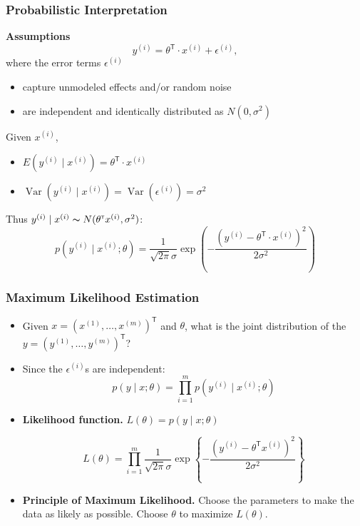 \documentclass[xcolor=table]{beamer}
\newcommand{\trans}[1]{\ensuremath{#1}^{\scriptscriptstyle{\textsf{T}}}}
\DeclareMathOperator{\Var}{Var}
\begin{document}
\begin{frame}[t]
\frametitle{Probabilistic Interpretation}
\textbf{Assumptions}
\[
    y^{(i)} = \trans{\theta} \cdot x^{(i)} + \epsilon^{(i)},  
\]
where the error terms $\epsilon^{(i)}$
\begin{itemize}
    \item capture unmodeled effects and/or random noise

    \item are independent and identically distributed as $N(0, \sigma^2)$ 
\end{itemize}

\pause

\medskip

Given $x^{(i)}$, 
\begin{itemize}
    \item $E(y^{(i)} \mid x^{(i)}) = \trans{\theta} \cdot x^{(i)}$
    
    \pause

    \item $\Var(y^{(i)} \mid x^{(i)}) = \Var(\epsilon^{(i)}) = \sigma^{2}$
\end{itemize}

\pause

\medskip

Thus $y^{(i)} \mid x^{(i)} \thicksim N(\trans{\theta} x^{(i)}, \sigma^2)$:
\[
    p(y^{(i)} \mid x^{(i)} ; \theta ) = \frac{1}{\sqrt{2 \pi} \sigma} 
                        \exp{\left ( - \frac{(y^{(i)} - \trans{\theta} \cdot x^{(i)})^2}{2 \sigma^2}\right )}
\]
\end{frame}

\begin{frame}[t]
\frametitle{Maximum Likelihood Estimation}
\begin{itemize}
    \item Given $x = \trans{(x^{(1)}, \ldots, x^{(m)})}$ and $\theta$, what is the joint distribution of 
            the $y = \trans{(y^{(1)}, \ldots, y^{(m)})}$? 

    \pause
    
    \item Since the $\epsilon^{(i)}$s are independent: \pause 
        \[
            p(y \mid x ; \theta) = \prod_{i = 1}^{m} p(y^{(i)} \mid x^{(i)} ; \theta)
        \]

    \pause

    \item \textbf{Likelihood function.} $L(\theta) = p(y \mid x ; \theta)$ 

    \pause
        
    \[
        L(\theta) = \prod_{i = 1}^{m} \frac{1}{\sqrt{2 \pi} \sigma} 
            \exp{\left \{ - \frac{\left ( y^{(i)} - \trans{\theta} x^{(i)} \right ) ^2}{2 \sigma^2} \right \}}
    \]
    
    \pause

    \item \textbf{Principle of Maximum Likelihood.} Choose the parameters to make the data as likely 
        as possible. Choose $\theta$ to maximize $L(\theta)$.
\end{itemize}
\end{frame}
\end{document}
